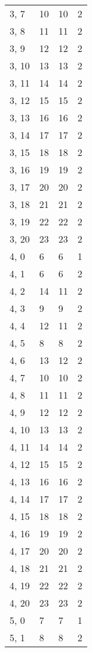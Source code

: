 \begin{table}
\begin{tabular}{llll}
3, 7   &   10 &   10 &     2 \\
3, 8   &   11 &   11 &     2 \\
3, 9   &   12 &   12 &     2 \\
3, 10  &   13 &   13 &     2 \\
3, 11  &   14 &   14 &     2 \\
3, 12  &   15 &   15 &     2 \\
3, 13  &   16 &   16 &     2 \\
3, 14  &   17 &   17 &     2 \\
3, 15  &   18 &   18 &     2 \\
3, 16  &   19 &   19 &     2 \\
3, 17  &   20 &   20 &     2 \\
3, 18  &   21 &   21 &     2 \\
3, 19  &   22 &   22 &     2 \\
3, 20  &   23 &   23 &     2 \\
4, 0   &    6 &    6 &     1 \\
4, 1   &    6 &    6 &     2 \\
4, 2   &   14 &   11 &     2 \\
4, 3   &    9 &    9 &     2 \\
4, 4   &   12 &   11 &     2 \\
4, 5   &    8 &    8 &     2 \\
4, 6   &   13 &   12 &     2 \\
4, 7   &   10 &   10 &     2 \\
4, 8   &   11 &   11 &     2 \\
4, 9   &   12 &   12 &     2 \\
4, 10  &   13 &   13 &     2 \\
4, 11  &   14 &   14 &     2 \\
4, 12  &   15 &   15 &     2 \\
4, 13  &   16 &   16 &     2 \\
4, 14  &   17 &   17 &     2 \\
4, 15  &   18 &   18 &     2 \\
4, 16  &   19 &   19 &     2 \\
4, 17  &   20 &   20 &     2 \\
4, 18  &   21 &   21 &     2 \\
4, 19  &   22 &   22 &     2 \\
4, 20  &   23 &   23 &     2 \\
5, 0   &    7 &    7 &     1 \\
5, 1   &    8 &    8 &     2 \\

\end{tabular}
\end{table}
